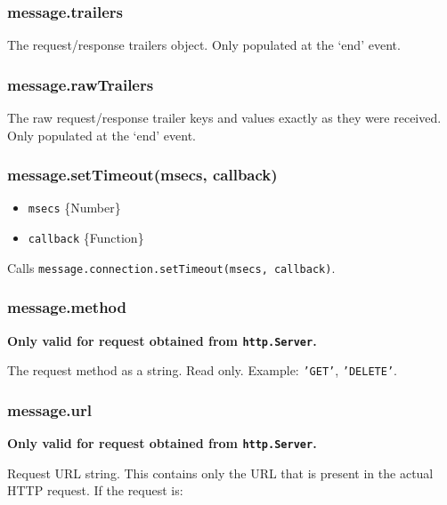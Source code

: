 \subsubsection{message.trailers}

The request/response trailers object. Only populated at the `end' event.

\subsubsection{message.rawTrailers}

The raw request/response trailer keys and values exactly as they were
received. Only populated at the `end' event.

\subsubsection{message.setTimeout(msecs, callback)}

\begin{itemize}
\item
  \texttt{msecs} \{Number\}
\item
  \texttt{callback} \{Function\}
\end{itemize}

Calls \texttt{message.connection.setTimeout(msecs, callback)}.

\subsubsection{message.method}

\textbf{Only valid for request obtained from \texttt{http.Server}.}

The request method as a string. Read only. Example: \texttt{'GET'},
\texttt{'DELETE'}.

\subsubsection{message.url}

\textbf{Only valid for request obtained from \texttt{http.Server}.}

Request URL string. This contains only the URL that is present in the
actual HTTP request. If the request is:

\begin{Shaded}
\begin{Highlighting}[]
\end{Highlighting}
\end{Shaded}

